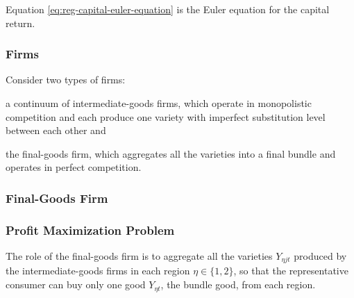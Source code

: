 \documentclass[../thesis.tex]{subfiles}
\begin{document}
Equation \ref{eq:reg-capital-euler-equation} is the Euler equation for the capital return.


\subsubsection*{Firms}

Consider two types of firms: 
\begin{enumerate*}[label=(\arabic*)]
	\item a continuum of intermediate-goods firms, which operate in monopolistic competition and each produce one variety with imperfect substitution level between each other and
	
	\item the final-goods firm, which aggregates all the varieties into a final bundle and operates in perfect competition.
\end{enumerate*}


\subsubsection{Final-Goods Firm}

\subsubsection*{Profit Maximization Problem}

The role of the final-goods firm is to aggregate all the varieties $Y_{\eta jt}$ produced by the intermediate-goods firms in each region $\eta \in \{1,2\}$, so that the representative consumer can buy only one good $Y_{\eta t}$, the bundle good, from each region.


\end{document}
